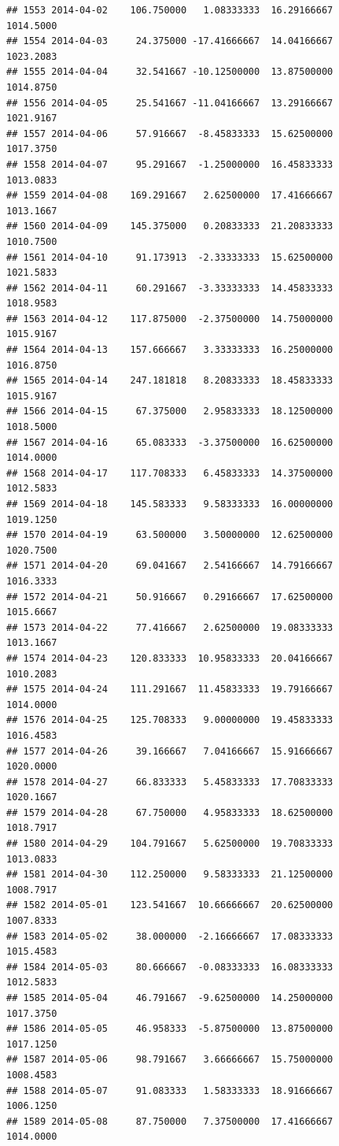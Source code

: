 \documentclass[
]{article}
\begin{document}
\begin{verbatim}
## 1553 2014-04-02    106.750000   1.08333333  16.29166667    1014.5000
## 1554 2014-04-03     24.375000 -17.41666667  14.04166667    1023.2083
## 1555 2014-04-04     32.541667 -10.12500000  13.87500000    1014.8750
## 1556 2014-04-05     25.541667 -11.04166667  13.29166667    1021.9167
## 1557 2014-04-06     57.916667  -8.45833333  15.62500000    1017.3750
## 1558 2014-04-07     95.291667  -1.25000000  16.45833333    1013.0833
## 1559 2014-04-08    169.291667   2.62500000  17.41666667    1013.1667
## 1560 2014-04-09    145.375000   0.20833333  21.20833333    1010.7500
## 1561 2014-04-10     91.173913  -2.33333333  15.62500000    1021.5833
## 1562 2014-04-11     60.291667  -3.33333333  14.45833333    1018.9583
## 1563 2014-04-12    117.875000  -2.37500000  14.75000000    1015.9167
## 1564 2014-04-13    157.666667   3.33333333  16.25000000    1016.8750
## 1565 2014-04-14    247.181818   8.20833333  18.45833333    1015.9167
## 1566 2014-04-15     67.375000   2.95833333  18.12500000    1018.5000
## 1567 2014-04-16     65.083333  -3.37500000  16.62500000    1014.0000
## 1568 2014-04-17    117.708333   6.45833333  14.37500000    1012.5833
## 1569 2014-04-18    145.583333   9.58333333  16.00000000    1019.1250
## 1570 2014-04-19     63.500000   3.50000000  12.62500000    1020.7500
## 1571 2014-04-20     69.041667   2.54166667  14.79166667    1016.3333
## 1572 2014-04-21     50.916667   0.29166667  17.62500000    1015.6667
## 1573 2014-04-22     77.416667   2.62500000  19.08333333    1013.1667
## 1574 2014-04-23    120.833333  10.95833333  20.04166667    1010.2083
## 1575 2014-04-24    111.291667  11.45833333  19.79166667    1014.0000
## 1576 2014-04-25    125.708333   9.00000000  19.45833333    1016.4583
## 1577 2014-04-26     39.166667   7.04166667  15.91666667    1020.0000
## 1578 2014-04-27     66.833333   5.45833333  17.70833333    1020.1667
## 1579 2014-04-28     67.750000   4.95833333  18.62500000    1018.7917
## 1580 2014-04-29    104.791667   5.62500000  19.70833333    1013.0833
## 1581 2014-04-30    112.250000   9.58333333  21.12500000    1008.7917
## 1582 2014-05-01    123.541667  10.66666667  20.62500000    1007.8333
## 1583 2014-05-02     38.000000  -2.16666667  17.08333333    1015.4583
## 1584 2014-05-03     80.666667  -0.08333333  16.08333333    1012.5833
## 1585 2014-05-04     46.791667  -9.62500000  14.25000000    1017.3750
## 1586 2014-05-05     46.958333  -5.87500000  13.87500000    1017.1250
## 1587 2014-05-06     98.791667   3.66666667  15.75000000    1008.4583
## 1588 2014-05-07     91.083333   1.58333333  18.91666667    1006.1250
## 1589 2014-05-08     87.750000   7.37500000  17.41666667    1014.0000

\end{verbatim}
\end{document}
